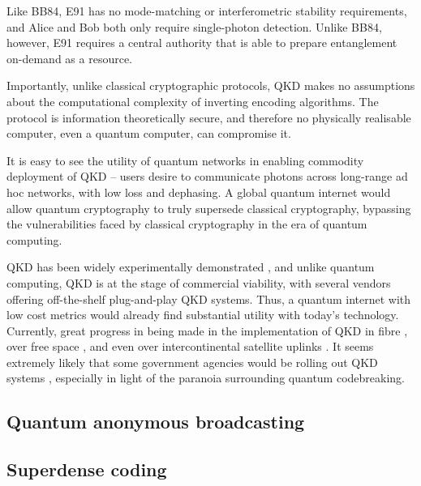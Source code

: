 \documentclass[aps,rmp,twocolumn,amsmath,amssymb,nofootinbib,superscriptaddress]{revtex4}
\newcommand{\comment}[1]{{\color{blue}{\textbf{#1}}}}
\begin{document}
Like BB84, E91 has no mode-matching or interferometric stability requirements, and Alice and Bob both only require single-photon detection. Unlike BB84, however, E91 requires a central authority that is able to prepare entanglement on-demand as a resource.

Importantly, unlike classical cryptographic protocols, QKD makes no assumptions about the computational complexity of inverting encoding algorithms. The protocol is information theoretically secure, and therefore no physically realisable computer, even a quantum computer, can compromise it.

It is easy to see the utility of quantum networks in enabling commodity deployment of QKD -- users desire to communicate photons across long-range ad hoc networks, with low loss and dephasing. A global quantum internet would allow quantum cryptography to truly supersede classical cryptography, bypassing the vulnerabilities faced by classical cryptography in the era of quantum computing.

QKD has been widely experimentally demonstrated \cite{???}, and unlike quantum computing, QKD is at the stage of commercial viability, with several vendors offering off-the-shelf plug-and-play QKD systems. Thus, a quantum internet with low cost metrics would already find substantial utility with today's technology. Currently, great progress in being made in the implementation of QKD in fibre \cite{???}, over free space \cite{bib:Buttler00}, and even over intercontinental satellite uplinks \cite{JWP}. It seems extremely likely that some government agencies would be rolling out QKD systems \cite{bib:Secret}, especially in light of the paranoia surrounding quantum codebreaking.

%
%

\subsection{Quantum anonymous broadcasting} \label{sec:anon_broad}

\cite{Wehner}

\comment{Ryan TO DO}

%
%

\subsection{Superdense coding}

\cite{???}

\comment{Ryan to do}
\end{document}

